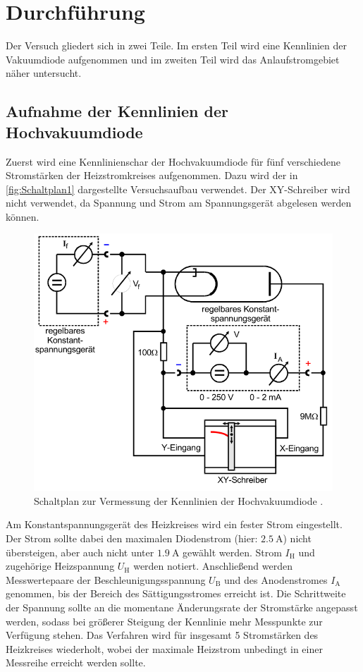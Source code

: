 \section{Durchführung}
\label{sec:Durchführung}
Der Versuch gliedert sich in zwei Teile. Im ersten Teil wird eine Kennlinien der Vakuumdiode aufgenommen und im zweiten Teil wird das Anlaufstromgebiet näher untersucht.

\subsection{Aufnahme der Kennlinien der Hochvakuumdiode}
\label{subsec:D_Kennlinie}
Zuerst wird eine Kennlinienschar der Hochvakuumdiode für fünf verschiedene Stromstärken der Heizstromkreises aufgenommen. Dazu wird der in \autoref{fig:Schaltplan1}
dargestellte Versuchsaufbau verwendet. Der XY-Schreiber wird nicht verwendet, da Spannung und Strom am Spannungsgerät abgelesen werden können.

\begin{figure}
    \centering
    \includegraphics[width = .6\textwidth]{content/Schaltplan1.png}
    \caption{Schaltplan zur Vermessung der Kennlinien der Hochvakuumdiode \cite{v504}.}
    \label{fig:Schaltplan1}
\end{figure}

Am Konstantspannungsgerät des Heizkreises wird ein fester Strom eingestellt. Der Strom sollte dabei den maximalen Diodenstrom (hier: $\qty{2.5}{\ampere}$) nicht übersteigen,
aber auch nicht unter $\qty{1.9}{\ampere}$ gewählt werden. Strom $I_\text{H}$ und zugehörige Heizspannung $U_\text{H}$ werden notiert. Anschließend werden Messwertepaare
der Beschleunigungsspannung $U_\text{B}$ und des Anodenstromes $I_\text{A}$ genommen, bis der Bereich des Sättigungsstromes erreicht ist. Die Schrittweite der Spannung 
sollte an die momentane Änderungsrate der Stromstärke angepasst werden, sodass bei größerer Steigung der Kennlinie mehr Messpunkte zur Verfügung stehen. Das Verfahren wird für
insgesamt 5 Stromstärken des Heizkreises wiederholt, wobei der maximale Heizstrom unbedingt in einer Messreihe erreicht werden sollte.

